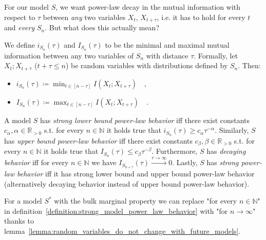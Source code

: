 \documentclass[../../main.tex]{subfiles}
\begin{document}
    For our model $S$, we want power-law decay in the mutual information with respect to $\tau$ between \emph{any} two variables $X_t$, $X_{t + \tau}$, i.e. it has to hold for every $t$ and \emph{every} $S_n$. But what does this actually mean?

    \begin{definition}
        We define $i_{S_n}(\tau)$ and $I_{S_n}(\tau)$ to be the minimal and maximal mutual information between any two variables of $S_n$ with distance $\tau$. Formally, let $X_t; X_{t + \tau}$ ($t + \tau \leq n$) be random variables with distributions defined by $S_n$. Then:
        \vspace{-1em}
        \begin{itemize}
            \item $i_{S_n}(\tau) \coloneqq \min_{t \in [n - \tau]} I(X_t; X_{t + \tau}) \quad ,$
            \item $I_{S_n}(\tau) \coloneqq \max_{t \in [n - \tau]} I(X_t; X_{t + \tau}) \quad .$
        \end{itemize}
    \end{definition}

    \begin{definition}
        \label{definition:strong_model_power_law_behavior}
        A model $S$ has \emph{strong lower bound power-law behavior} iff there exist constants $c_\alpha, \alpha \in \mathbb{R}_{>0}$ s.t. for every $n \in \mathbb{N}$ it holds true that $i_{S_n}(\tau) \geq c_\alpha \tau^{-\alpha}$. Similarly, $S$ has \emph{upper bound power-law behavior} iff there exist constants $c_\beta, \beta \in \mathbb{R}_{>0}$ s.t. for every $n \in \mathbb{N}$ it holds true that $I_{S_n}(\tau) \leq c_\beta \tau^{-\beta}$. Furthermore, $S$ has \emph{decaying behavior} iff for every $n \in \mathbb{N}$ we have $I_{S_{n + \tau}}(\tau) \xrightarrow{\tau \to \infty} 0$. Lastly, $S$ has \emph{strong power-law behavior} iff it has strong lower bound and upper bound power-law behavior (alternatively decaying behavior instead of upper bound power-law behavior).
    \end{definition}

    \begin{remark}
        For a model $S^*$ with the bulk marginal property we can replace "for every $n \in \mathbb{N}$" in definition~\ref{definition:strong_model_power_law_behavior} with "for $n \to \infty$" thanks to lemma~\ref{lemma:random_variables_do_not_change_with_future_models}.
    \end{remark}
\end{document}
